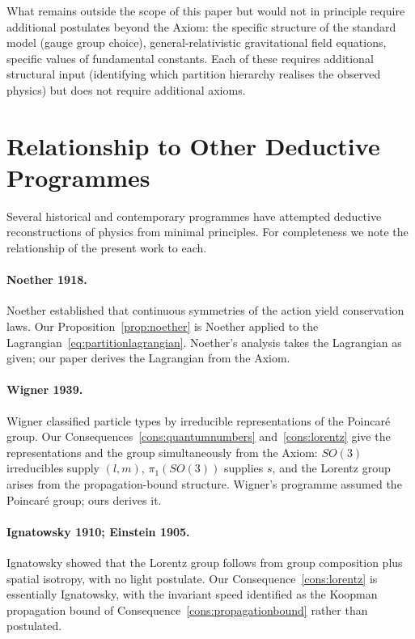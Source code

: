\documentclass[11pt,twocolumn,a4paper]{article}
\theoremstyle{axiomstyle}
\theoremstyle{conseqstyle}
\theoremstyle{definition}
\theoremstyle{remark}
\begin{document}
What remains outside the scope of this paper but would not in principle require additional postulates beyond the Axiom: the specific structure of the standard model (gauge group choice), general-relativistic gravitational field equations, specific values of fundamental constants. Each of these requires additional structural input (identifying which partition hierarchy realises the observed physics) but does not require additional axioms.

\section{Relationship to Other Deductive Programmes}
\label{sec:relationship}

Several historical and contemporary programmes have attempted deductive reconstructions of physics from minimal principles. For completeness we note the relationship of the present work to each.

\paragraph{Noether 1918.} Noether established that continuous symmetries of the action yield conservation laws. Our Proposition~\ref{prop:noether} is Noether applied to the Lagrangian~\eqref{eq:partitionlagrangian}. Noether's analysis takes the Lagrangian as given; our paper derives the Lagrangian from the Axiom.

\paragraph{Wigner 1939.} Wigner classified particle types by irreducible representations of the Poincar\'e group. Our Consequences~\ref{cons:quantumnumbers} and~\ref{cons:lorentz} give the representations and the group simultaneously from the Axiom: $SO(3)$ irreducibles supply $(l,m)$, $\pi_{1}(SO(3))$ supplies $s$, and the Lorentz group arises from the propagation-bound structure. Wigner's programme assumed the Poincar\'e group; ours derives it.

\paragraph{Ignatowsky 1910; Einstein 1905.} Ignatowsky showed that the Lorentz group follows from group composition plus spatial isotropy, with no light postulate. Our Consequence~\ref{cons:lorentz} is essentially Ignatowsky, with the invariant speed identified as the Koopman propagation bound of Consequence~\ref{cons:propagationbound} rather than postulated.
\end{document}
